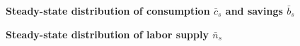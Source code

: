 \documentclass[letterpaper,12pt]{article}
\theoremstyle{definition}
\begin{document}
    \begin{figure}[htb]\centering \captionsetup{width=4.0in}
      \caption{\label{FigOGmodelSSbc}\textbf{Steady-state distribution of consumption $\bar{c}_s$ and savings $\bar{b}_s$}}
    \end{figure}

    \begin{figure}[htb]\centering \captionsetup{width=4.0in}
      \caption{\label{FigOGmodelSSn}\textbf{Steady-state distribution of labor supply $\bar{n}_s$}}
    \end{figure}
\end{document}
